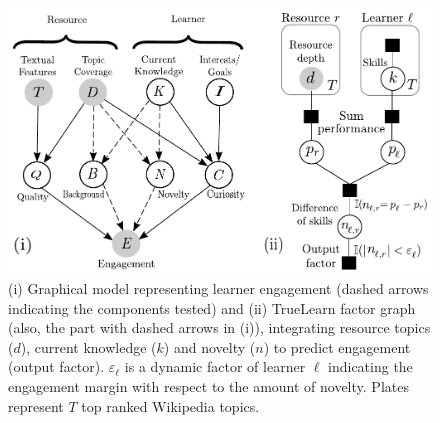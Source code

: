\documentclass[letterpaper]{article} %
\begin{document}
\begin{figure}[!tbp]
 \centering
 \includegraphics[width=\columnwidth]{./engagement_model_truelearn_model_v3.pdf}
 \caption{(i) Graphical model representing learner engagement (dashed arrows indicating the components tested) and (ii) TrueLearn factor graph (also, the part with dashed arrows in (i)), integrating resource topics ($d$), current knowledge ($k$) and novelty ($n$) to predict engagement (output factor). $\varepsilon_\ell$ is a dynamic factor of learner $\ell$ indicating the engagement margin with respect to the amount of novelty. Plates represent $T$ top ranked Wikipedia topics.}
 \label{fig:learner_model}
\end{figure}
\end{document}
